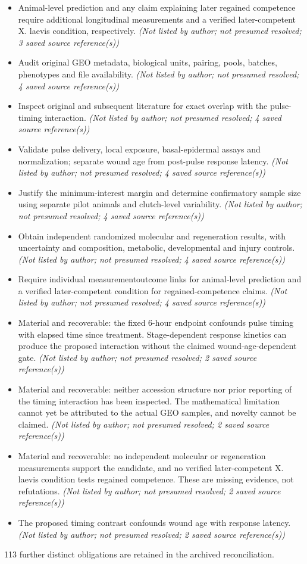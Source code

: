 \documentclass[11pt]{article}
\begin{document}
\begin{itemize}
\item Animal-level prediction and any claim explaining later regained competence require additional longitudinal measurements and a verified later-competent X. laevis condition, respectively. \textit{ (Not listed by author; not presumed resolved; 3 saved source reference(s))}
\item Audit original GEO metadata, biological units, pairing, pools, batches, phenotypes and file availability. \textit{ (Not listed by author; not presumed resolved; 4 saved source reference(s))}
\item Inspect original and subsequent literature for exact overlap with the pulse-timing interaction. \textit{ (Not listed by author; not presumed resolved; 4 saved source reference(s))}
\item Validate pulse delivery, local exposure, basal-epidermal assays and normalization; separate wound age from post-pulse response latency. \textit{ (Not listed by author; not presumed resolved; 4 saved source reference(s))}
\item Justify the minimum-interest margin and determine confirmatory sample size using separate pilot animals and clutch-level variability. \textit{ (Not listed by author; not presumed resolved; 4 saved source reference(s))}
\item Obtain independent randomized molecular and regeneration results, with uncertainty and composition, metabolic, developmental and injury controls. \textit{ (Not listed by author; not presumed resolved; 4 saved source reference(s))}
\item Require individual measurement\textendash{}outcome links for animal-level prediction and a verified later-competent condition for regained-competence claims. \textit{ (Not listed by author; not presumed resolved; 4 saved source reference(s))}
\item Material and recoverable: the fixed 6-hour endpoint confounds pulse timing with elapsed time since treatment. Stage-dependent response kinetics can produce the proposed interaction without the claimed wound-age-dependent gate. \textit{ (Not listed by author; not presumed resolved; 2 saved source reference(s))}
\item Material and recoverable: neither accession structure nor prior reporting of the timing interaction has been inspected. The mathematical limitation cannot yet be attributed to the actual GEO samples, and novelty cannot be claimed. \textit{ (Not listed by author; not presumed resolved; 2 saved source reference(s))}
\item Material and recoverable: no independent molecular or regeneration measurements support the candidate, and no verified later-competent X. laevis condition tests regained competence. These are missing evidence, not refutations. \textit{ (Not listed by author; not presumed resolved; 2 saved source reference(s))}
\item The proposed timing contrast confounds wound age with response latency. \textit{ (Not listed by author; not presumed resolved; 2 saved source reference(s))}
\end{itemize}
113 further distinct obligations are retained in the archived reconciliation.
\end{document}

